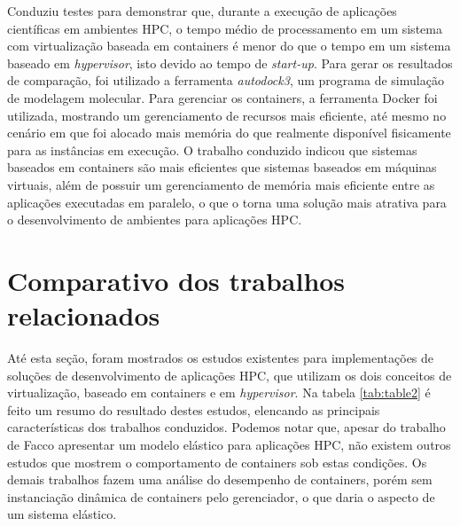 \documentclass[twoside,english,brazilian]{UNISINOSartigo}
\begin{document}
 Conduziu testes para demonstrar que, durante a execução de aplicações científicas em ambientes HPC, o tempo médio de processamento em um sistema com virtualização baseada em containers é menor do que o tempo em um sistema baseado em \textit{hypervisor}, isto devido ao tempo de \textit{start-up}. Para gerar os resultados de comparação, foi utilizado a ferramenta \textit{autodock3}, um programa de simulação de modelagem molecular. Para gerenciar os containers, a ferramenta Docker foi utilizada, mostrando um gerenciamento de recursos mais eficiente, até mesmo no cenário em que foi alocado mais memória do que realmente disponível fisicamente para as instâncias em execução. 
O trabalho conduzido indicou que sistemas baseados em containers são mais eficientes que sistemas baseados em máquinas virtuais, além de possuir um gerenciamento de memória mais eficiente entre as aplicações executadas em paralelo, o que o torna uma solução mais atrativa para o desenvolvimento de ambientes para aplicações HPC.

\section{Comparativo dos trabalhos relacionados}
\label{comparacao}
Até esta seção, foram mostrados os estudos existentes para implementações de soluções de desenvolvimento de aplicações HPC, que utilizam os dois conceitos de virtualização, baseado em containers e em \textit{hypervisor}. Na tabela \ref{tab:table2} é feito um resumo do resultado destes estudos, elencando as principais características dos trabalhos conduzidos. Podemos notar que, apesar do trabalho de Facco  apresentar um modelo elástico para aplicações HPC, não existem outros estudos que mostrem o comportamento de containers sob estas condições. Os demais trabalhos fazem uma análise do desempenho de containers, porém sem instanciação dinâmica de containers pelo gerenciador, o que daria o aspecto de um sistema elástico.
\end{document}
